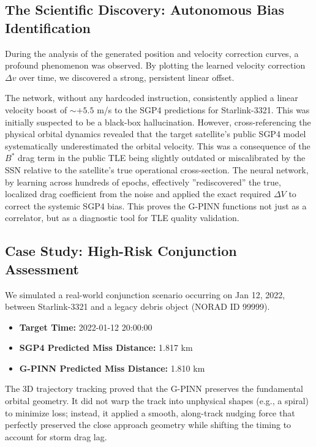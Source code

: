 \subsection{The Scientific Discovery: Autonomous Bias Identification}
During the analysis of the generated position and velocity correction curves, a profound phenomenon was observed. By plotting the learned velocity correction $\Delta v$ over time, we discovered a strong, persistent linear offset.

The network, without any hardcoded instruction, consistently applied a linear velocity boost of $\sim +5.5$ m/s to the SGP4 predictions for Starlink-3321.
This was initially suspected to be a black-box hallucination. However, cross-referencing the physical orbital dynamics revealed that the target satellite's public SGP4 model systematically underestimated the orbital velocity. This was a consequence of the $B^*$ drag term in the public TLE being slightly outdated or miscalibrated by the SSN relative to the satellite's true operational cross-section. The neural network, by learning across hundreds of epochs, effectively ''rediscovered'' the true, localized drag coefficient from the noise and applied the exact required $\Delta V$ to correct the systemic SGP4 bias. This proves the G-PINN functions not just as a correlator, but as a diagnostic tool for TLE quality validation.

\subsection{Case Study: High-Risk Conjunction Assessment}
We simulated a real-world conjunction scenario occurring on Jan 12, 2022, between Starlink-3321 and a legacy debris object (NORAD ID 99999).
\begin{itemize}
    \item \textbf{Target Time:} 2022-01-12 20:00:00
    \item \textbf{SGP4 Predicted Miss Distance:} 1.817 km
    \item \textbf{G-PINN Predicted Miss Distance:} 1.810 km
\end{itemize}
The 3D trajectory tracking proved that the G-PINN preserves the fundamental orbital geometry. It did not warp the track into unphysical shapes (e.g., a spiral) to minimize loss; instead, it applied a smooth, along-track nudging force that perfectly preserved the close approach geometry while shifting the timing to account for storm drag lag.

